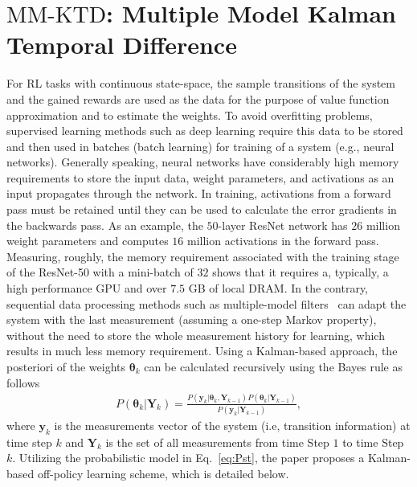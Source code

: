 \documentclass{ieeeaccess}
\def\MMK{\text{MM-KTD}}
\def\k{_{k}}
\def\bt{\bm{\theta}}
\def\Y{\bm{Y}}
\def\pk{_{k-1}}
\def\y{\bm{y}}
\begin{document}
\section{$\MMK$: Multiple Model Kalman Temporal Difference} \label{sec:MM-KTD}
For RL tasks with continuous state-space, the sample transitions of the system and the gained rewards are used as the data for the purpose of value function approximation and to estimate the weights. To avoid overfitting problems, supervised learning methods such as deep learning require this data to be stored and then used in batches (batch learning) for training of a system (e.g., neural networks).
Generally speaking, neural networks have considerably high memory requirements to store the input data, weight parameters, and activations as an input propagates through the network. In training, activations from a forward pass must be retained until they can be used to calculate the error gradients in the backwards pass. As an example, the $50$-layer ResNet network has $26$ million weight parameters and computes $16$ million activations in the forward pass. Measuring, roughly, the memory requirement associated with the training stage  of the ResNet-50 with a mini-batch of $32$ shows that it requires a, typically, a high performance GPU and over $7.5$ GB of local DRAM. In the contrary, sequential data processing methods such as multiple-model filters~\cite{AK1,AK2,AK3, AK4} can adapt the system with the last measurement (assuming a one-step Markov property), without the need to store the whole measurement history for learning, which results in much less memory requirement.
Using a Kalman-based approach, the posteriori of the weights $\bt\k$ can be calculated recursively using the Bayes rule as follows
%
\begin{eqnarray}
P(\bt\k|\Y\k) = \frac{P(\y\k|\bt\k, \Y\pk) P(\bt\k|\Y\pk)}{P(\y\k|\Y\pk)},\label{eq:Pst}
\end{eqnarray}
%
where $\y\k$ is the measurements vector of the system (i.e, transition information) at time step $k$ and $\Y\k$ is the set of all measurements from time Step $1$ to time Step $k$. Utilizing the probabilistic model in Eq.~\eqref{eq:Pst}, the paper proposes a Kalman-based off-policy learning scheme,  which is detailed below.

\end{document}
